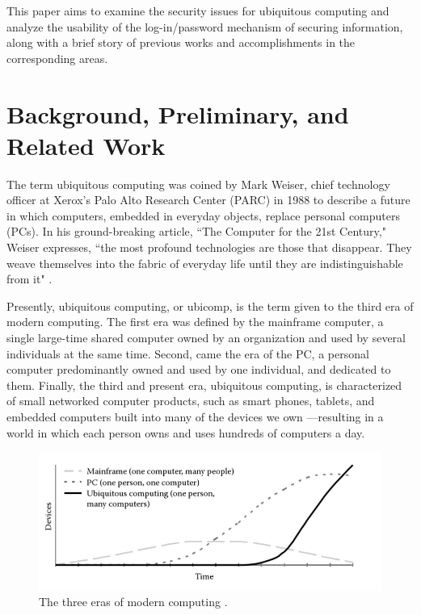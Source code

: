 \documentclass{article}
\begin{document}
This paper aims to examine the security issues for ubiquitous computing and analyze the usability of the log-in/password mechanism of securing information, along with a brief story of previous works and accomplishments in the corresponding areas. 

\section{Background, Preliminary, and Related Work}
The term ubiquitous computing was coined by Mark Weiser, chief technology officer at Xerox's Palo Alto Research Center (PARC) in 1988 to describe a future in which computers, embedded in everyday objects, replace personal computers (PCs). In his ground-breaking article, ``The Computer for the 21st Century," Weiser expresses, ``the most profound technologies are those that disappear. They weave themselves into the fabric of everyday life until they are indistinguishable from it" \cite{weiser1991computer}.

Presently, ubiquitous computing, or ubicomp, is the term given to the third era of modern computing. The first era was defined by the mainframe computer, a single large-time shared computer owned by an organization and used by several individuals at the same time. Second, came the era of the PC, a personal computer predominantly owned and used by one individual, and dedicated to them. Finally, the third and present era, ubiquitous computing, is characterized of small networked computer products, such as smart phones, tablets, and embedded computers built into many of the devices we own ---resulting in a world in which each person owns and uses hundreds of computers a day.

\begin{figure}
  \centering
    \includegraphics[scale=0.7]{eras_modern_computing}
     \caption{The three eras of modern computing \cite{weiser1991computer}.}
\end{figure}
\end{document}

